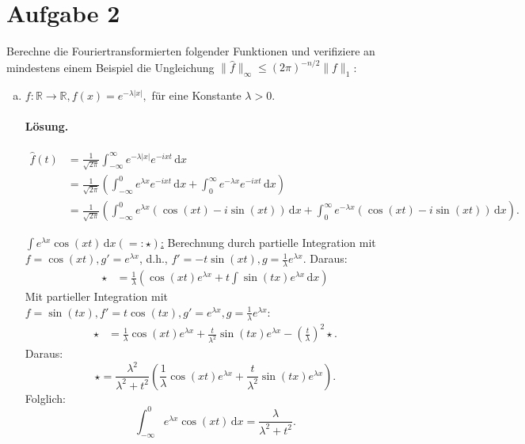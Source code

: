 \documentclass[10pt]{article}\usepackage[]{graphicx}\usepackage[]{color}
\newcommand{\R}{\mathbb{R}}
\newcommand{\df}{\,\textrm{d}}
\begin{document}
\section*{Aufgabe 2}
Berechne die Fouriertransformierten folgender Funktionen
und verifiziere an mindestens einem Beispiel die Ungleichung
$\| \widehat{f} \|_{\infty} \leq (2\pi)^{-n/2}\|f\|_1$:
\begin{enumerate}[(a)]
  \item $f: \R \to \R, f(x) = e^{-\lambda |x|},$ für eine Konstante $\lambda > 0$.
  
  
  \paragraph{Lösung.}
\begin{align*}
  \widehat{f}(t)
  &= \frac{1}{\sqrt{2\pi}} \int_{-\infty}^{\infty} e^{-\lambda|x|}e^{-ixt} \df x \\
  &= \frac{1}{\sqrt{2\pi}} \left(\int_{-\infty}^0 e^{\lambda x}e^{-ixt} \df x  + \int_{0}^{\infty} e^{-\lambda x}e^{-ixt} \df x\right) \\
  &= \frac{1}{\sqrt{2\pi}} \left(\int_{-\infty}^0 e^{\lambda x}(\cos(xt) - i\sin(xt)) \df x + \int_{0}^{\infty} e^{-\lambda x}(\cos(xt) - i\sin(xt)) \df x\right).
\end{align*}

\uline{$\int e^{\lambda x}\cos(xt) \df x (=: \star)$:} Berechnung durch partielle Integration
mit $f = \cos(xt), g' = e^{\lambda x}$, d.h.,
$f' = -t\sin(xt), g = \frac{1}{\lambda}e^{\lambda x}$.
Daraus:
\begin{align*}
  \star &= \frac{1}{\lambda} \left(\cos(xt)e^{\lambda x} + t\int \sin(tx)e^{\lambda x} \df x\right)
\end{align*}
Mit partieller Integration mit $f = \sin(tx), f' = t\cos(tx), g' = e^{\lambda x}, g = \frac{1}{\lambda}e^{\lambda x}$:
\begin{align*}
  \star &= \frac{1}{\lambda} \cos(xt)e^{\lambda x} + \frac{t}{\lambda^2} \sin(tx)e^{\lambda x} - \left(\frac{t}{\lambda}\right)^2 \star.
\end{align*}
Daraus:
\[
 \star = \frac{\lambda^2}{\lambda^2 + t^2}\left(\frac{1}{\lambda} \cos(xt)e^{\lambda x} + \frac{t}{\lambda^2}\sin(tx)e^{\lambda x}\right).
\]
Folglich:
\[
 \int_{-\infty}^0 e^{\lambda x}\cos(xt) \df x
 = \frac{\lambda}{\lambda^2 + t^2}.
\]


\end{enumerate}
\end{document}
